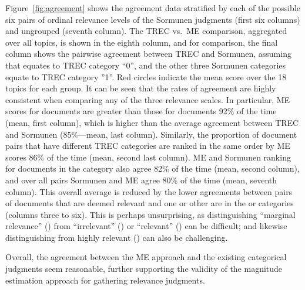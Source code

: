 Figure~\ref{fig:agreement} shows the agreement data stratified by each of the possible six pairs of
ordinal relevance levels of the Sormunen judgments (first six columns)
and ungrouped (seventh column).
The TREC vs.\ ME comparison, aggregated over all topics, is shown in the
eighth column, and for comparison, the final column shows the pairwise
agreement between TREC and Sormunen, assuming that 
\nn equates  to TREC category ``0'', and the other three Sormunen categories 
equate to TREC category ''1''.
Red circles indicate the mean score over the 18 topics for each group.
It can be seen that the rates of agreement are highly consistent when
comparing any of the three relevance scales.
In particular, ME scores for \hh documents are greater than those for 
\nn documents 92\% of the time (mean, first column), which is
higher than the average agreement between TREC and Sormunen
(85\%---mean, last column).
Similarly, the proportion of document pairs that have different TREC
categories are ranked in the same order by ME scores 86\% of the time
(mean, second last column).
ME  and Sormunen ranking for documents in the \nn\rr category
also agree 82\% of the time (mean, second column), and over all pairs
Sormunen and ME agree 80\% of the time (mean, seventh column).
This overall average is reduced by the lower agreements between pairs
of documents that are deemed relevant and one or other are in the 
\mm or \rr categories (columns three to six).
This is perhaps unsurprising, as distinguishing ``marginal relevance'' (\mm)
from ``irrelevant'' (\nn) or ``relevant'' (\rr) can be difficult; and likewise 
distinguishing \rr from highly relevant (\hh) can also be challenging.

Overall, the agreement between the ME approach and the existing 
categorical judgments seem reasonable, 
further supporting the validity of the magnitude estimation
approach for gathering relevance judgments.


